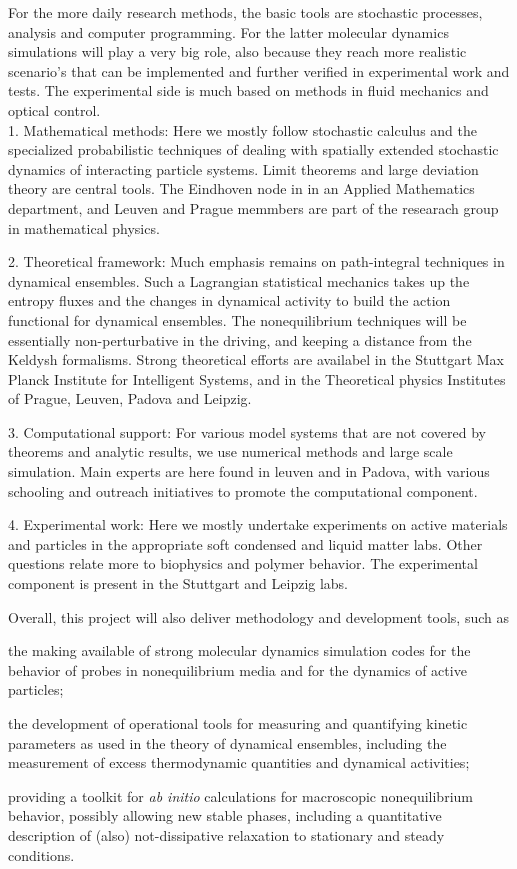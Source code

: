 For the more daily research methods, the basic tools are stochastic processes, analysis and computer programming.  For the latter molecular dynamics simulations will play a very big role, also because they reach more realistic scenario's that can be implemented and further verified in experimental work and tests.  The experimental side is much based on methods in fluid mechanics and optical control.\\

1. Mathematical methods: Here we mostly follow stochastic calculus and the specialized
probabilistic techniques of dealing with spatially extended stochastic dynamics of
interacting particle systems. Limit theorems and large deviation theory are central tools.
The Eindhoven node in in an Applied Mathematics department, and Leuven and Prague memmbers
are part of the researach group in mathematical physics.

2. Theoretical framework: Much emphasis remains on path-integral techniques in dynamical
ensembles.  Such a Lagrangian statistical mechanics takes up the entropy fluxes and the
changes in dynamical activity to build the action functional for dynamical ensembles.  The
nonequilibrium techniques will be essentially non-perturbative in the driving, and keeping a
distance from the Keldysh formalisms. Strong theoretical efforts are availabel in the
Stuttgart Max Planck Institute for Intelligent Systems, and in the Theoretical physics
Institutes of Prague, Leuven, Padova and Leipzig.

3. Computational support: For various model systems that are not covered by theorems and
analytic results, we use numerical methods and large scale simulation.  Main experts are
here found in leuven and in Padova, with various schooling and outreach initiatives to
promote the computational component.

4. Experimental work: Here we mostly undertake experiments on active materials and particles
in the appropriate soft condensed and liquid matter labs.  Other questions relate more to
biophysics and polymer behavior. The experimental component is present in the Stuttgart and
Leipzig labs.

Overall, this project will also deliver methodology and development tools, such as
\begin{inparaenum}[A.]
	\item the making available of strong molecular dynamics simulation codes for the behavior of
	probes in nonequilibrium media and for the dynamics of active particles;
	\item the development of operational tools for measuring and quantifying kinetic parameters
	as used in the theory of dynamical ensembles, including the measurement of excess
	thermodynamic quantities and dynamical activities;
	\item providing a toolkit for {\it ab initio} calculations for macroscopic nonequilibrium
	behavior, possibly allowing new stable phases, including a quantitative description of
	(also) not-dissipative relaxation to stationary and steady conditions.
\end{inparaenum}


